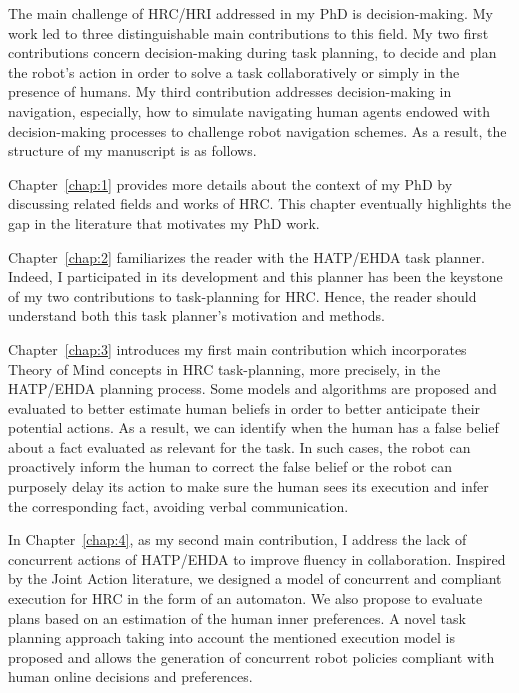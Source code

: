 
The main challenge of HRC/HRI addressed in my PhD is decision-making. My work led to three distinguishable main contributions to this field. My two first contributions concern decision-making during task planning, to decide and plan the robot's action in order to solve a task collaboratively or simply in the presence of humans. My third contribution addresses decision-making in navigation, especially, how to simulate navigating human agents endowed with decision-making processes to challenge robot navigation schemes. 
As a result, the structure of my manuscript is as follows.

Chapter~\ref{chap:1} provides more details about the context of my PhD by discussing related fields and works of HRC. This chapter eventually highlights the gap in the literature that motivates my PhD work.

Chapter~\ref{chap:2} familiarizes the reader with the HATP/EHDA task planner. Indeed, I participated in its development and this planner has been the keystone of my two contributions to task-planning for HRC. Hence, the reader should understand both this task planner's motivation and methods.

Chapter~\ref{chap:3} introduces my first main contribution which incorporates Theory of Mind concepts in HRC task-planning, more precisely, in the HATP/EHDA planning process.
Some models and algorithms are proposed and evaluated to better estimate human beliefs in order to better anticipate their potential actions. As a result, we can identify when the human has a false belief about a fact evaluated as relevant for the task. In such cases, the robot can proactively inform the human to correct the false belief or the robot can purposely delay its action to make sure the human sees its execution and infer the corresponding fact, avoiding verbal communication. 

In Chapter~\ref{chap:4}, as my second main contribution, I address the lack of concurrent actions of HATP/EHDA to improve fluency in collaboration. Inspired by the Joint Action literature, we designed a model of concurrent and compliant execution for HRC in the form of an automaton. We also propose to evaluate plans based on an estimation of the human inner preferences. A novel task planning approach taking into account the mentioned execution model is proposed and allows the generation of concurrent robot policies compliant with human online decisions and preferences. 

